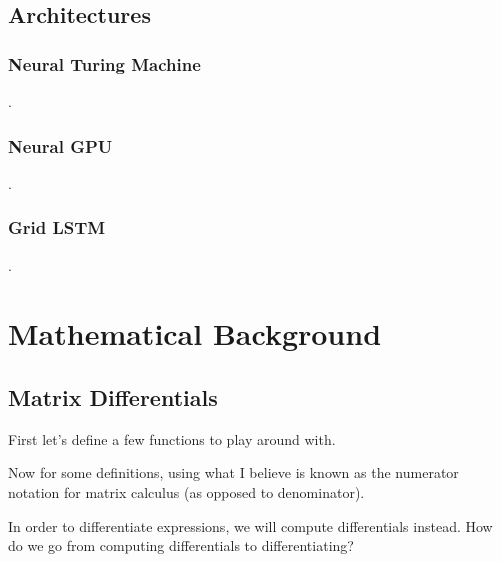\documentclass[12pt]{article}
\begin{document}
\subsection{Architectures}

\subsubsection{Neural Turing Machine}
.
\subsubsection{Neural GPU}
.
\subsubsection{Grid LSTM}
.
\section{Mathematical Background}

\subsection{Matrix Differentials}

First let's define a few functions to play around with.


Now for some definitions, using what I believe is known as the numerator notation for matrix calculus (as opposed to denominator).



In order to differentiate expressions, we will compute differentials instead. How do we go from computing differentials to differentiating?
\end{document}
